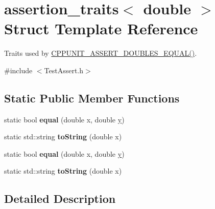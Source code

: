 \hypertarget{structassertion__traits_3_01double_01_4}{\section{assertion\+\_\+traits$<$ double $>$ Struct Template Reference}
\label{structassertion__traits_3_01double_01_4}
}


Traits used by \hyperlink{group___assertions_ga9d88b1e379e4a9ba2a5e9e79763389ea}{C\+P\+P\+U\+N\+I\+T\+\_\+\+A\+S\+S\+E\+R\+T\+\_\+\+D\+O\+U\+B\+L\+E\+S\+\_\+\+E\+Q\+U\+A\+L()}.  




{\ttfamily \#include $<$Test\+Assert.\+h$>$}

\subsection*{Static Public Member Functions}
\begin{DoxyCompactItemize}
\item 
\hypertarget{structassertion__traits_3_01double_01_4_ac0d9d71ec0f239664b88188e481c0598}{static bool {\bfseries equal} (double x, double \hyperlink{_ice_utils_8h_aa7ffaed69623192258fb8679569ff9ba}{y})}\label{structassertion__traits_3_01double_01_4_ac0d9d71ec0f239664b88188e481c0598}

\item 
\hypertarget{structassertion__traits_3_01double_01_4_a6bc37874eb60d30e0b50d4c127ab34df}{static std\+::string {\bfseries to\+String} (double x)}\label{structassertion__traits_3_01double_01_4_a6bc37874eb60d30e0b50d4c127ab34df}

\item 
\hypertarget{structassertion__traits_3_01double_01_4_ac0d9d71ec0f239664b88188e481c0598}{static bool {\bfseries equal} (double x, double \hyperlink{_ice_utils_8h_aa7ffaed69623192258fb8679569ff9ba}{y})}\label{structassertion__traits_3_01double_01_4_ac0d9d71ec0f239664b88188e481c0598}

\item 
\hypertarget{structassertion__traits_3_01double_01_4_a6bc37874eb60d30e0b50d4c127ab34df}{static std\+::string {\bfseries to\+String} (double x)}\label{structassertion__traits_3_01double_01_4_a6bc37874eb60d30e0b50d4c127ab34df}

\end{DoxyCompactItemize}


\subsection{Detailed Description}
